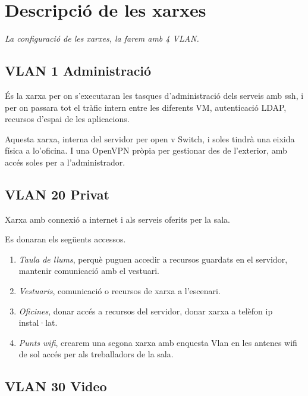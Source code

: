 \documentclass[
  10pt,
]{krantz}
\begin{document}
\hypertarget{descripciuxf3-de-les-xarxes}{%
\section{Descripció de les xarxes}\label{descripciuxf3-de-les-xarxes}}

\emph{La configuració de les xarxes, la farem amb 4 VLAN.}

\hypertarget{vlan-1-administraciuxf3}{%
\subsection{VLAN 1 Administració}\label{vlan-1-administraciuxf3}}

És la xarxa per on s'executaran les tasques d'administració dels serveis amb ssh, i per on passara tot el tràfic intern entre les diferents VM, autenticació LDAP, recursos d'espai de les aplicacions.

Aquesta xarxa, interna del servidor per open v Switch, i soles tindrà una eixida física a lo'oficina. I una OpenVPN pròpia per gestionar des de l'exterior, amb accés soles per a l'administrador.

\hypertarget{vlan-20-privat}{%
\subsection{VLAN 20 Privat}\label{vlan-20-privat}}

Xarxa amb connexió a internet i als serveis oferits per la sala.

Es donaran els següents accessos.

\begin{enumerate}
\def\labelenumi{\arabic{enumi}.}
\item
  \emph{Taula de llums}, perquè puguen accedir a recursos guardats en el servidor, mantenir comunicació amb el vestuari.
\item
  \emph{Vestuaris}, comunicació o recursos de xarxa a l'escenari.
\item
  \emph{Oficines}, donar accés a recursos del servidor, donar xarxa a telèfon ip instal·lat.
\item
  \emph{Punts wifi}, crearem una segona xarxa amb enquesta Vlan en les antenes wifi de sol accés per als treballadors de la sala.
\end{enumerate}

\hypertarget{vlan-30-video}{%
\subsection{VLAN 30 Video}\label{vlan-30-video}}
\end{document}

